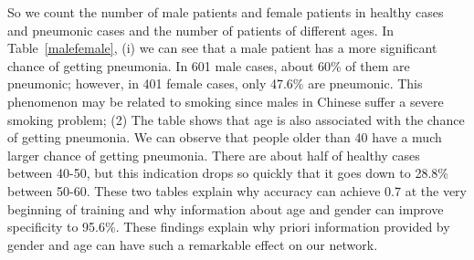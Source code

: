 \documentclass[journal]{IEEEtran}
\begin{document}
So we count the number of male patients and female patients in healthy cases and pneumonic cases and the number of patients of different ages. 
In Table~\ref{malefemale}, (i) we can see that a male patient has a more significant chance of getting pneumonia. In 601 male cases, about 60\% of them are pneumonic; however, in 401 female cases, only 47.6\% are pneumonic. This phenomenon may be related to smoking since males in Chinese suffer a severe smoking problem; (2) The table shows that age is also associated with the chance of getting pneumonia. We can observe that people older than 40 have a much larger chance of getting pneumonia. There are about half of healthy cases between 40-50, but this indication drops so quickly that it goes down to 28.8\% between 50-60. These two tables explain why accuracy can achieve 0.7 at the very beginning of training and why information about age and gender can improve specificity to 95.6\%. These findings explain why priori information provided by gender and age can have such a remarkable effect on our network.
\end{document}
